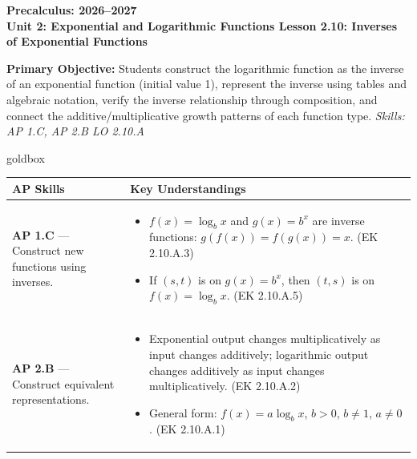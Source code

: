 \documentclass[10pt]{article}
\newcommand{\CourseName}{Precalculus}
\newcommand{\SchoolYear}{2026--2027}
\newcommand{\UnitNumberName}{Unit 2: Exponential and Logarithmic Functions \quad}
\newcommand{\LessonNumberName}{Lesson 2.10: Inverses of Exponential Functions}
\begin{document}
\begin{center}
    {\Large\bfseries \CourseName: \SchoolYear \\
    {\small\bfseries \UnitNumberName \LessonNumberName}}
\end{center}

\begin{tcolorbox}[colback=sky, colframe=navy, boxrule=0.9pt, arc=2mm,
    left=2mm, right=2mm, top=1.5mm, bottom=1.5mm]
    \textbf{Primary Objective:} Students construct the logarithmic function as the inverse of
    an exponential function (initial value 1), represent the inverse using tables and algebraic
    notation, verify the inverse relationship through composition, and connect the
    additive/multiplicative growth patterns of each function type.
    \hfill\textit{\small Skills: AP 1.C, AP 2.B \quad LO 2.10.A}
\end{tcolorbox}

\renewcommand{\arraystretch}{1.6}
\begin{skillbox}{goldbox}
\begin{tabularx}{\linewidth}{@{}X X@{}}
\textbf{AP Skills} &
\textbf{Key Understandings} \\
\midrule
\textbf{AP 1.C} --- Construct new functions using inverses. &
\begin{itemize}[leftmargin=1.2em,itemsep=2pt,topsep=0pt]
  \item $f(x) = \log_b x$ and $g(x) = b^x$ are inverse functions:
        $g(f(x)) = f(g(x)) = x$. (EK 2.10.A.3)
  \item If $(s,t)$ is on $g(x) = b^x$, then $(t,s)$ is on $f(x) = \log_b x$.
        (EK 2.10.A.5)
\end{itemize} \\
\textbf{AP 2.B} --- Construct equivalent representations. &
\begin{itemize}[leftmargin=1.2em,itemsep=2pt,topsep=0pt]
  \item Exponential output changes multiplicatively as input changes additively;
        logarithmic output changes additively as input changes multiplicatively.
        (EK 2.10.A.2)
  \item General form: $f(x) = a\log_b x$, $b > 0$, $b \ne 1$, $a \ne 0$.
        (EK 2.10.A.1)
\end{itemize} \\
\end{tabularx}
\end{skillbox}
\end{document}
